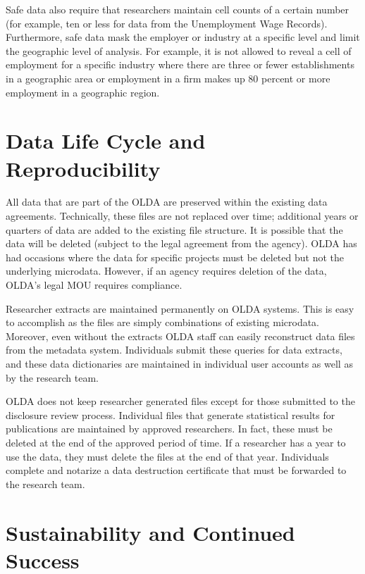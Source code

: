 Safe data also require that researchers maintain cell counts of a certain number (for example, ten or less for data from the Unemployment Wage Records). Furthermore, safe data mask the employer or industry at a specific level and limit the geographic level of analysis. For example, it is not allowed to reveal a cell of employment for a specific industry where there are three or fewer establishments in a geographic area or employment in a firm makes up 80 percent or more employment in a geographic region.

\hypertarget{data-life-cycle-and-reproducibility}{%
\section{Data Life Cycle and Reproducibility}\label{data-life-cycle-and-reproducibility}}

All data that are part of the OLDA are preserved within the existing data agreements. Technically, these files are not replaced over time; additional years or quarters of data are added to the existing file structure. It is possible that the data will be deleted (subject to the legal agreement from the agency). OLDA has had occasions where the data for specific projects must be deleted but not the underlying microdata. However, if an agency requires deletion of the data, OLDA's legal MOU requires compliance.

Researcher extracts are maintained permanently on OLDA systems. This is easy to accomplish as the files are simply combinations of existing microdata. Moreover, even without the extracts OLDA staff can easily reconstruct data files from the metadata system. Individuals submit these queries for data extracts, and these data dictionaries are maintained in individual user accounts as well as by the research team.

OLDA does not keep researcher generated files except for those submitted to the disclosure review process. Individual files that generate statistical results for publications are maintained by approved researchers. In fact, these must be deleted at the end of the approved period of time. If a researcher has a year to use the data, they must delete the files at the end of that year. Individuals complete and notarize a data destruction certificate that must be forwarded to the research team.

\hypertarget{sustainability-and-continued-success-1}{%
\section{Sustainability and Continued Success}\label{sustainability-and-continued-success-1}}

